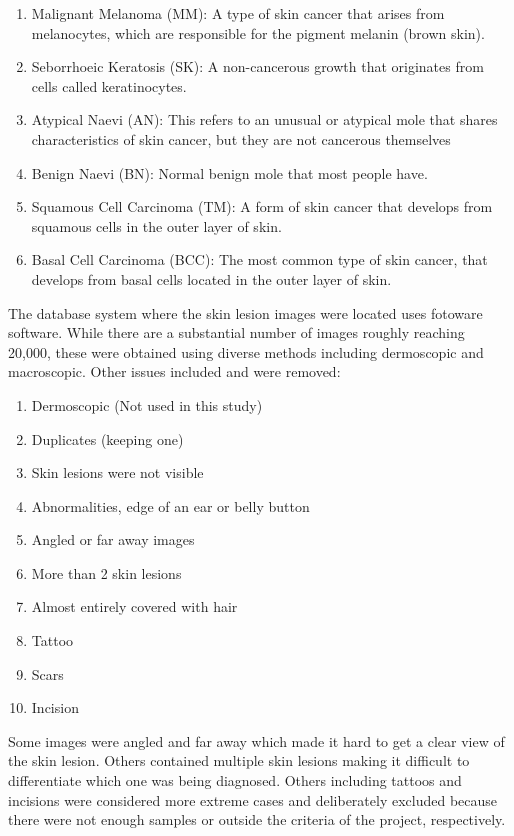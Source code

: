 \begin{enumerate}
    \item Malignant Melanoma (MM): A type of skin cancer that arises from melanocytes, which are responsible for the pigment melanin (brown skin).
    \item Seborrhoeic Keratosis (SK): A non-cancerous growth that originates from cells called keratinocytes.
    \item Atypical Naevi (AN): This refers to an unusual or atypical mole that shares characteristics of skin cancer, but they are not cancerous themselves
    \item Benign Naevi (BN): Normal benign mole that most people have.
    \item Squamous Cell Carcinoma (TM): A form of skin cancer that develops from squamous cells in the outer layer of skin.
    \item Basal Cell Carcinoma (BCC): The most common type of skin cancer, that develops from basal cells located in the outer layer of skin.
\end{enumerate}

The database system where the skin lesion images were located uses fotoware software. While there are a substantial number of images roughly reaching 20,000, these were obtained using diverse methods including dermoscopic and macroscopic. Other issues included and were removed: 

\begin{enumerate}
    \item Dermoscopic (Not used in this study)
    \item Duplicates (keeping one)
    \item Skin lesions were not visible
    \item Abnormalities, edge of an ear or belly button
    \item Angled or far away images
    \item More than 2 skin lesions
    \item Almost entirely covered with hair
    \item Tattoo
    \item Scars
    \item Incision
\end{enumerate}

Some images were angled and far away which made it hard to get a clear view of the skin lesion. Others contained multiple skin lesions making it difficult to differentiate which one was being diagnosed. Others including tattoos and incisions were considered more extreme cases and deliberately excluded because there were not enough samples or outside the criteria of the project, respectively. 

